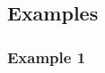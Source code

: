 






    \subsection{Examples}
        \label{sec:examples}

        \subsubsection{Example 1}
            \label{sec:ddi-example-1}

